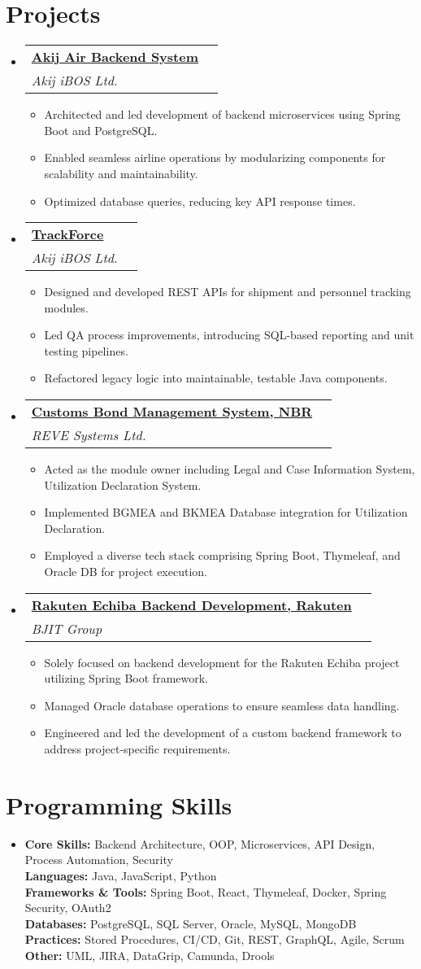 \documentclass[a4paper,11pt]{article}
\makeatletter
\newcommand{\resumeItem}[1]{\item[$\bullet$] \small{#1 \vspace{-2pt}}}
\newcommand{\resumeSubHeadingListStart}{\begin{itemize}[leftmargin=0pt, label={}]}
\newcommand{\resumeSubHeadingListEnd}{\end{itemize}}
\newcommand{\resumeItemListStart}{\begin{itemize}}
\newcommand{\resumeItemListEnd}{\end{itemize}\vspace{-5pt}}
\newcommand{\resumeSubheading}[5]{
    \vspace{-1pt}\item
    \begin{tabular*}{1\textwidth}{l@{\extracolsep{\fill}}r}
    \textbf{\href{#4}{#1}} & #2 \\
    \textit{\small#3} & \textit{\small #5} \\
    \end{tabular*}\vspace{-5pt}
}
\makeatother
\begin{document}
\section{Projects}
\resumeSubHeadingListStart
\resumeSubheading
{Akij Air Backend System}{}
{Akij iBOS Ltd.}{https://ibos.io/}{}
\resumeItemListStart
\resumeItem{Architected and led development of backend microservices using Spring Boot and PostgreSQL.}
\resumeItem{Enabled seamless airline operations by modularizing components for scalability and maintainability.}
\resumeItem{Optimized database queries, reducing key API response times.}
\resumeItemListEnd
\resumeSubheading
{TrackForce}{}
{Akij iBOS Ltd.}{https://app.trackforce.io/}{}
\resumeItemListStart
\resumeItem{Designed and developed REST APIs for shipment and personnel tracking modules.}
\resumeItem{Led QA process improvements, introducing SQL-based reporting and unit testing pipelines.}
\resumeItem{Refactored legacy logic into maintainable, testable Java components.}
\resumeItemListEnd
\resumeSubheading
{Customs Bond Management System, NBR}{}
{REVE Systems Ltd.}{https://cusbond.gov.bd/}{}
\resumeItemListStart
\resumeItem{Acted as the module owner including Legal and Case Information System, Utilization Declaration System.}
\resumeItem{Implemented BGMEA and BKMEA Database integration for Utilization Declaration.}
\resumeItem{Employed a diverse tech stack comprising Spring Boot, Thymeleaf, and Oracle DB for project execution.}
\resumeItemListEnd
\resumeSubheading
{Rakuten Echiba Backend Development, Rakuten}{}
{BJIT Group}{https://www.rakuten.co.jp/}{}
\resumeItemListStart
\resumeItem{Solely focused on backend development for the Rakuten Echiba project utilizing Spring Boot framework.}
\resumeItem{Managed Oracle database operations to ensure seamless data handling.}
\resumeItem{Engineered and led the development of a custom backend framework to address project-specific requirements.}
\resumeItemListEnd
\resumeSubHeadingListEnd

\section{Programming Skills}
\resumeSubHeadingListStart
\item{
      \textbf{Core Skills:} Backend Architecture, OOP, Microservices, API Design, Process Automation, Security \\
      \textbf{Languages:} Java, JavaScript, Python \\
      \textbf{Frameworks \& Tools:} Spring Boot, React, Thymeleaf, Docker, Spring Security, OAuth2 \\
      \textbf{Databases:} PostgreSQL, SQL Server, Oracle, MySQL, MongoDB \\
      \textbf{Practices:} Stored Procedures, CI/CD, Git, REST, GraphQL, Agile, Scrum \\
      \textbf{Other:} UML, JIRA, DataGrip, Camunda, Drools
}
\resumeSubHeadingListEnd
\end{document}
